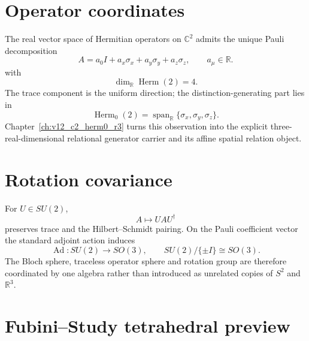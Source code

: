 \documentclass[11pt,a4paper,twoside]{book}
\theoremstyle{definition}
\begin{document}
\section{Operator coordinates}

The real vector space of Hermitian operators on $\mathbb C^2$ admits the unique Pauli decomposition
\begin{equation}
\boxed{
A=a_0I+a_x\sigma_x+a_y\sigma_y+a_z\sigma_z,
\qquad a_\mu\in\mathbb R.
}
\label{eq:v12_pauli_decomposition}
\end{equation}
with
\begin{equation}
\dim_{\mathbb R}\operatorname{Herm}(2)=4.
\end{equation}
The trace component is the uniform direction; the distinction-generating part lies in
\begin{equation}
\operatorname{Herm}_0(2)
=\operatorname{span}_{\mathbb R}\{\sigma_x,\sigma_y,\sigma_z\}.
\end{equation}
Chapter~\ref{ch:v12_c2_herm0_r3} turns this observation into the explicit three-real-dimensional relational generator carrier and its affine spatial relation object.

\section{Rotation covariance}

For $U\in SU(2)$,
\begin{equation}
A\mapsto UAU^\dagger
\end{equation}
preserves trace and the Hilbert--Schmidt pairing. On the Pauli coefficient vector the standard adjoint action induces
\begin{equation}
\boxed{
\operatorname{Ad}:SU(2)\to SO(3),
\qquad
SU(2)/\{\pm I\}\cong SO(3).
}
\label{eq:v12_su2_so3}
\end{equation}
The Bloch sphere, traceless operator sphere and rotation group are therefore coordinated by one algebra rather than introduced as unrelated copies of $S^2$ and $\mathbb R^3$.

\section{Fubini--Study tetrahedral preview}
\end{document}
